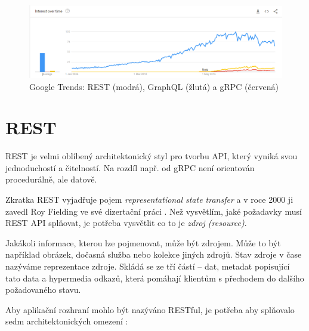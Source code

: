 \documentclass[thesis=M,czech]{FITthesis}[2019/12/23]
\begin{document}
\begin{figure}[h]
    \includegraphics[width=\linewidth]{img/interest_trend.png}
    \caption{Google Trends: REST (modrá), GraphQL (žlutá) a gRPC (červená) \cite{google-trends}}
	\label{google_trends_img}
\end{figure}

\section{REST}
REST je velmi oblíbený architektonický styl pro tvorbu API, který vyniká svou jednoduchostí a čitelností. Na rozdíl např. od gRPC není orientován procedurálně, ale datově.

Zkratka REST vyjadřuje pojem \textit{representational state transfer} a v roce 2000 ji zavedl Roy Fielding ve své dizertační práci \cite{fielding00}. Než vysvětlím, jaké požadavky musí REST API splňovat, je potřeba vysvětlit co to je \textit{zdroj (resource)}.

Jakákoli informace, kterou lze pojmenovat, může být zdrojem. Může to být například obrázek, dočasná služba nebo kolekce jiných zdrojů. Stav zdroje v čase nazýváme reprezentace zdroje. Skládá se ze tří částí -- dat, metadat popisující tato data a hypermedia odkazů, která pomáhají klientům s přechodem do dalšího požadovaného stavu.

Aby aplikační rozhraní mohlo být nazýváno RESTful, je potřeba aby splňovalo sedm architektonických omezení \cite{restful_api}:
\end{document}
